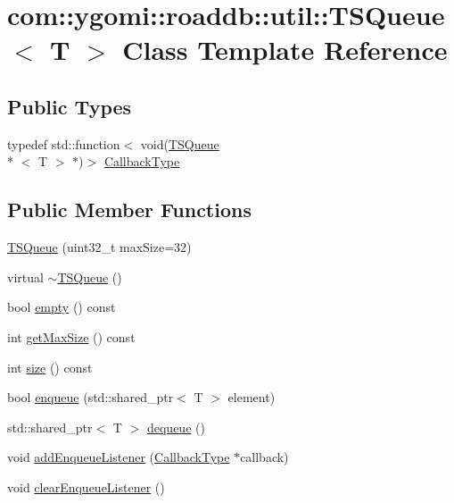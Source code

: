 \hypertarget{classcom_1_1ygomi_1_1roaddb_1_1util_1_1TSQueue}{\section{com\-:\-:ygomi\-:\-:roaddb\-:\-:util\-:\-:T\-S\-Queue$<$ T $>$ Class Template Reference}
\label{classcom_1_1ygomi_1_1roaddb_1_1util_1_1TSQueue}
}
\subsection*{Public Types}
\begin{DoxyCompactItemize}
\item 
typedef std\-::function$<$ void(\hyperlink{classcom_1_1ygomi_1_1roaddb_1_1util_1_1TSQueue}{T\-S\-Queue}\\*
$<$ T $>$ $\ast$)$>$ \hyperlink{classcom_1_1ygomi_1_1roaddb_1_1util_1_1TSQueue_aa81eeb34e0d4b311c71838a14fce7e2f}{Callback\-Type}
\end{DoxyCompactItemize}
\subsection*{Public Member Functions}
\begin{DoxyCompactItemize}
\item 
\hyperlink{classcom_1_1ygomi_1_1roaddb_1_1util_1_1TSQueue_a8671f03fd0e0cb6343b4320eceaad756}{T\-S\-Queue} (uint32\-\_\-t max\-Size=32)
\item 
virtual \hyperlink{classcom_1_1ygomi_1_1roaddb_1_1util_1_1TSQueue_ae6cd63f91b3f8acfc2fb024a0f502b78}{$\sim$\-T\-S\-Queue} ()
\item 
bool \hyperlink{classcom_1_1ygomi_1_1roaddb_1_1util_1_1TSQueue_abcc079279d8a9ea9e893688a8091f2d1}{empty} () const 
\item 
int \hyperlink{classcom_1_1ygomi_1_1roaddb_1_1util_1_1TSQueue_a93b080b3e5d2826b8935bc99c84cbc85}{get\-Max\-Size} () const 
\item 
int \hyperlink{classcom_1_1ygomi_1_1roaddb_1_1util_1_1TSQueue_a793306954e163e23bcfe097f85667821}{size} () const 
\item 
bool \hyperlink{classcom_1_1ygomi_1_1roaddb_1_1util_1_1TSQueue_af9932c6261a05455ddba853cb7f07ddd}{enqueue} (std\-::shared\-\_\-ptr$<$ T $>$ element)
\item 
std\-::shared\-\_\-ptr$<$ T $>$ \hyperlink{classcom_1_1ygomi_1_1roaddb_1_1util_1_1TSQueue_ab04c41abb275f83c8fb1ac0b723a8de5}{dequeue} ()
\item 
void \hyperlink{classcom_1_1ygomi_1_1roaddb_1_1util_1_1TSQueue_a505f5fee729f59577303267f0dfe5f40}{add\-Enqueue\-Listener} (\hyperlink{classcom_1_1ygomi_1_1roaddb_1_1util_1_1TSQueue_aa81eeb34e0d4b311c71838a14fce7e2f}{Callback\-Type} $\ast$callback)
\item 
void \hyperlink{classcom_1_1ygomi_1_1roaddb_1_1util_1_1TSQueue_a4cb1849202ceda7adcb0a3aab004a3cf}{clear\-Enqueue\-Listener} ()
\end{DoxyCompactItemize}


